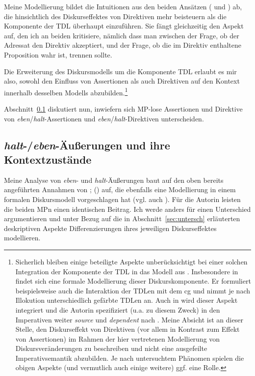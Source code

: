 Meine Modellierung bildet die Intuitionen aus den beiden Ansätzen (\citealt{Gutzmann2011} und \citealt{Farkas2011}) ab, die hinsichtlich des Diskurseffektes von Direktiven mehr beisteuern als die Komponente der TDL überhaupt einzuführen. Sie fängt gleichzeitig den Aspekt auf, den ich an beiden kritisiere, nämlich dass man zwischen der Frage, ob der Adressat den Direktiv akzeptiert, und der Frage, ob die im Direktiv enthaltene Proposition wahr ist, trennen sollte.

Die Erweiterung des Diskursmodells um die Komponente TDL erlaubt es mir also, sowohl den Einfluss von Assertionen als auch Direktiven auf den Kontext innerhalb desselben Modells abzubilden.\footnote{Sicherlich bleiben einige beteiligte Aspekte unberücksichtigt bei einer solchen Integration der Komponente der TDL in das Modell aus \citet{Farkas2010}. Insbesondere in \citet{Portner2007} findet sich eine formale Modellierung dieser Diskurskomponente. Er formuliert beispielsweise auch die Interaktion der TDLen mit dem cg und nimmt je nach Illokution unterschiedlich \glqq gefärbte\grqq{} TDLen an. Auch in \citet{Farkas2011} wird dieser Aspekt integriert und die Autorin spezifiziert (u.a. zu diesem Zweck) in den Imperativen weiter \textit{source} und \textit{dependent} nach \citet{Gunlogson2008}. Meine Absicht ist an dieser Stelle, den Diskurseffekt von Direktiven (vor allem in Kontrast zum Effekt von Assertionen) im Rahmen der hier vertretenen Modellierung von Diskursveränderungen zu beschreiben und nicht eine ausgefeilte Imperativsemantik abzubilden. Je nach untersuchtem Phänomen spielen die obigen Aspekte (und vermutlich auch einige weitere) ggf. eine Rolle.}

Abschnitt~\ref{sec:kontexte} diskutiert nun, inwiefern sich MP-lose Assertionen und Direktive von \textit{eben}/\textit{halt}-Assertionen und \textit{eben}/\textit{halt}-Direktiven unterscheiden.

\subsection{\textit{halt}-/\textit{eben}-Äußerungen und ihre Kontextzustände}
\label{sec:kontexte}
Meine Analyse von \textit{eben}- und \textit{halt}-Äußerungen baut auf den oben bereits angeführten Annahmen von \citet{Karagjosova2003}; (\citeyear{Karagjosova2004}) auf, die ebenfalls eine Modellierung in einem formalen Diskursmodell vorgeschlagen hat (vgl. auch \citealt[152-159]{Mueller2016a}). Für die Autorin leisten die beiden MPn einen identi\-schen Beitrag. Ich werde anders für einen Unterschied argumentieren und unter Bezug auf die in Abschnitt~\ref{sec:untersch} erläuterten deskriptiven Aspekte Differenzierungen ihres jeweiligen Diskurseffektes modellieren.

